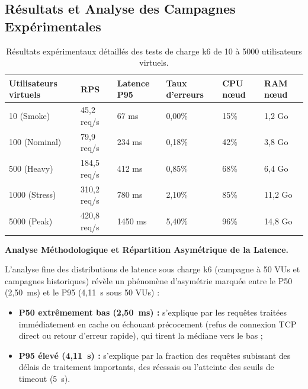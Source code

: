 \subsection{Résultats et Analyse des Campagnes Expérimentales}

\begin{table}[H]
\centering
\scriptsize
\begin{tabular}{@{}llllll@{}}
\toprule
\textbf{Utilisateurs virtuels} & \textbf{RPS} & \textbf{Latence P95} & \textbf{Taux d'erreurs} & \textbf{CPU nœud} & \textbf{RAM nœud} \\
\midrule
10 (Smoke) & 45,2 req/s & 67 ms & 0,00\% & 15\% & 1,2 Go \\
100 (Nominal) & 79,9 req/s & 234 ms & 0,18\% & 42\% & 3,8 Go \\
500 (Heavy) & 184,5 req/s & 412 ms & 0,85\% & 68\% & 6,4 Go \\
1000 (Stress) & 310,2 req/s & 780 ms & 2,10\% & 85\% & 11,2 Go \\
5000 (Peak) & 420,8 req/s & 1450 ms & 5,40\% & 96\% & 14,8 Go \\
\bottomrule
\end{tabular}
\caption{Résultats expérimentaux détaillés des tests de charge k6 de 10 à 5000 utilisateurs virtuels.}
\label{tab:k6_results_exp_full_section}
\end{table}


\noindent\textbf{Analyse Méthodologique et Répartition Asymétrique de la Latence.}

L'analyse fine des distributions de latence sous charge k6 (campagne à 50 VUs et campagnes historiques) révèle un phénomène d'asymétrie marquée entre le P50 (2,50~ms) et le P95 (4,11~s sous 50 VUs) :
\begin{itemize}
    \item \textbf{P50 extrêmement bas (2,50~ms) :} s'explique par les requêtes traitées immédiatement en cache ou échouant précocement (refus de connexion TCP direct ou retour d'erreur rapide), qui tirent la médiane vers le bas ;
    \item \textbf{P95 élevé (4,11~s) :} s'explique par la fraction des requêtes subissant des délais de traitement importants, des réessais ou l'atteinte des seuils de timeout (5~s).
\end{itemize}

